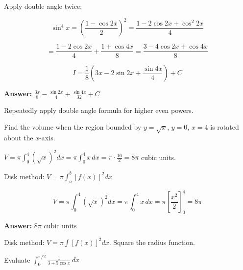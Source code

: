 \begin{solution}
Apply double angle twice:

\[
\sin^4 x = \left(\frac{1-\cos 2x}{2}\right)^2 = \frac{1-2\cos 2x+\cos^2 2x}{4}
\]

\[
= \frac{1-2\cos 2x}{4} + \frac{1+\cos 4x}{8} = \frac{3-4\cos 2x+\cos 4x}{8}
\]

\[
I = \frac{1}{8}\left(3x - 2\sin 2x + \frac{\sin 4x}{4}\right) + C
\]

\textbf{Answer:} $\boxed{\frac{3x}{8} - \frac{\sin 2x}{4} + \frac{\sin 4x}{32} + C}$
\end{solution}

\begin{takeaways}
Repeatedly apply double angle formula for higher even powers.
\end{takeaways}

\vspace{1cm}

\begin{problem}
Find the volume when the region bounded by $y = \sqrt{x}$, $y = 0$, $x = 4$ is rotated about the $x$-axis.
\end{problem}

\begin{hint}
$V = \pi\int_0^4 (\sqrt{x})^2 dx = \pi\int_0^4 x \, dx = \pi \cdot \frac{16}{2} = 8\pi$ cubic units.
\end{hint}

\begin{solution}
Disk method: $V = \pi\int_a^b [f(x)]^2dx$

\[
V = \pi\int_0^4 (\sqrt{x})^2dx = \pi\int_0^4 x\,dx = \pi\left[\frac{x^2}{2}\right]_0^4 = 8\pi
\]

\textbf{Answer:} $\boxed{8\pi \text{ cubic units}}$
\end{solution}

\begin{takeaways}
Disk method: $V=\pi\int[f(x)]^2dx$. Square the radius function.
\end{takeaways}

\vspace{1cm}

\begin{problem}
Evaluate $\displaystyle \int_0^{\pi/2} \frac{1}{3 + 5\cos x} \, dx$
\end{problem}

